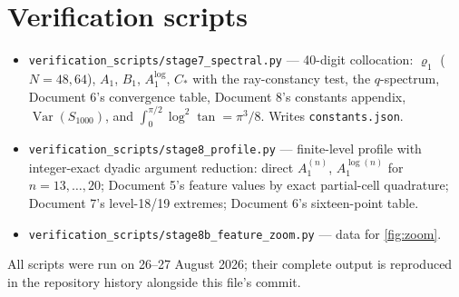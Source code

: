 \documentclass[11pt,oneside]{article}
\theoremstyle{definition}
\theoremstyle{remark}
\newcommand{\Var}{\operatorname{Var}}
\begin{document}
\section{Verification scripts}
\label{app:scripts}

\begin{itemize}
\item \nolinkurl{verification_scripts/stage7_spectral.py} ---
40-digit collocation: $\varrho_1$ ($N=48,64$), $A_1$, $B_1$,
$A_1^{\log}$, $C_*$ with the ray-constancy test, the $q$-spectrum,
Document 6's convergence table, Document 8's constants appendix,
$\Var(S_{1000})$, and $\int_0^{\pi/2}\log^2\tan=\pi^3/8$.  Writes
\nolinkurl{constants.json}.
\item \nolinkurl{verification_scripts/stage8_profile.py} ---
finite-level profile with integer-exact dyadic argument reduction:
direct $A_1^{(n)}$, $A_1^{\log(n)}$ for $n=13,\dots,20$; Document 5's
feature values by exact partial-cell quadrature; Document 7's
level-18/19 extremes; Document 6's sixteen-point table.
\item \nolinkurl{verification_scripts/stage8b_feature_zoom.py} ---
data for \cref{fig:zoom}.
\end{itemize}
All scripts were run on 26--27 August 2026; their complete output is
reproduced in the repository history alongside this file's commit.
\end{document}
